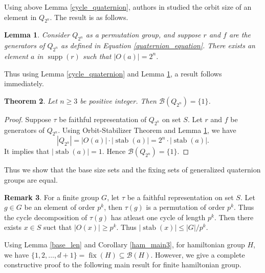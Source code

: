 \documentclass[12pt]{article}
\theoremstyle{plain}
\newtheorem{theorem}{Theorem}[section]
\newtheorem{lemma}[theorem]{Lemma}
\theoremstyle{definition}
\newtheorem{remark}[theorem]{Remark}
\newcommand{\stab}{\mathop{\mathrm{stab}}}
\newcommand{\fix}{\mathop{\mathrm{fix}}}
\newcommand{\supp}{\mathop{\mathrm{supp}}}
\begin{document}
Using above Lemma \ref{cycle_quaternion}, authors in \cite{lklgchh} studied the orbit size of an element in $Q_{2^{n}}$. The result is as follows.
	\begin{lemma} \cite{lklgchh}
		\label{cycle_quaternion1}
		Consider $Q_{2^{n}}$ as a permutation group, and suppose $r$ and $f$ are the generators of $Q_{2^{n}}$ as defined in Equation \ref{quaternion_equation}. There exists an element $a$ in  $\supp(r)$ such that $|O(a)| = 2^{n}$.
	\end{lemma}
	Thus using Lemma \ref{cycle_quaternion} and Lemma
	\ref{cycle_quaternion1}, a result follows immediately.
	
	\begin{theorem}
		\label{base_quaternion}
		Let $n \geq 3$ be positive integer. Then $\mathcal{B}(Q_{2^{n}}) = \{1\}$.
	\end{theorem} 
	\begin{proof}
		Suppose $\tau$ be faithful representation of $Q_{2^{n}}$ on set $S$. Let $r$ and $f$ be generators of $Q_{2^{n}}$. Using Orbit-Stabilizer Theorem and Lemma \ref{cycle_quaternion1}, we have
		\begin{equation*}
			|Q_{2^{n}}| = |O(a)|\cdot |\stab(a)| = 2^{n} \cdot |\stab(a)|.
		\end{equation*} 
		It implies that $|\stab(a)| = 1$. Hence $\mathcal{B}(Q_{2^{n}}) = \{1\}$.
	\end{proof}
	Thus we show that the base size sets and the fixing sets of generalized quaternion groups are equal.
	\begin{remark}
		\label{stab_rem}
		For a finite group $G$, let $\tau$ be a faithful representation on set $S$. Let $g \in G$ be an element of order $p^{k}$, then $\tau(g)$ is a permutation of order $p^{k}$. Thus the cycle decomposition of $\tau(g)$ has atleast one cycle of length $p^{k}$. Then there exists $x \in S$ suct that $|O(x)| \geq p^{k}$. Thus $|\stab(x)| \leq |G| /p^{k}$.
	\end{remark}
	Using Lemma \ref{base_len} and Corollary \ref{ham_main3}, for hamiltonian group $H$, we have $\{1,2,\ldots,d+1\} =\fix(H) \subseteq \mathcal{B}(H)$. However, we give a complete constructive proof to the following main result for finite hamiltonian group.
	
\end{document}
